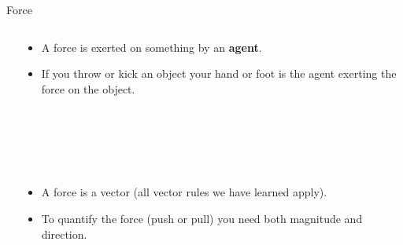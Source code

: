 \documentclass{beamer}
\begin{document}
\begin{frame}{Force}
\begin{columns}
\begin{column}{0.4\textwidth}
\begin{center}
\end{center}
\end{column}
\begin{column}{0.6\textwidth}
\begin{itemize}
   \item A force is exerted on something by an {\bf agent}.
   \item If you throw or kick an object your hand or foot is the agent exerting the force on the object.
   \\~\\~\\~\\~\\~\\
   \item A force is a vector (all vector rules we have learned apply).
   \item To quantify the force (push or pull) you need both magnitude and direction.
\end{itemize}
\end{column}
\end{columns}
\end{frame}
\end{document}
